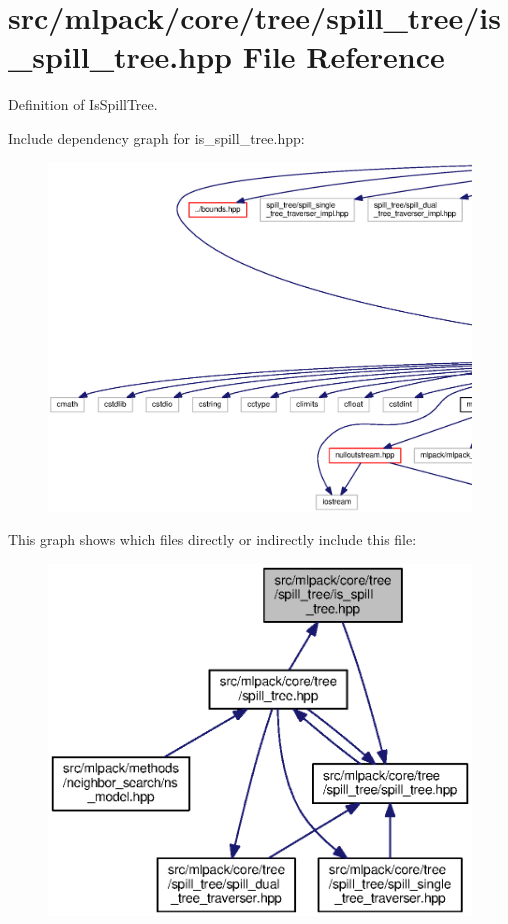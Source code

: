 \section{src/mlpack/core/tree/spill\+\_\+tree/is\+\_\+spill\+\_\+tree.hpp File Reference}
\label{is__spill__tree_8hpp}


Definition of Is\+Spill\+Tree.  


Include dependency graph for is\+\_\+spill\+\_\+tree.\+hpp\+:
\nopagebreak
\begin{figure}[H]
\begin{center}
\leavevmode
\includegraphics[width=350pt]{is__spill__tree_8hpp__incl}
\end{center}
\end{figure}
This graph shows which files directly or indirectly include this file\+:
\nopagebreak
\begin{figure}[H]
\begin{center}
\leavevmode
\includegraphics[width=350pt]{is__spill__tree_8hpp__dep__incl}
\end{center}
\end{figure}
